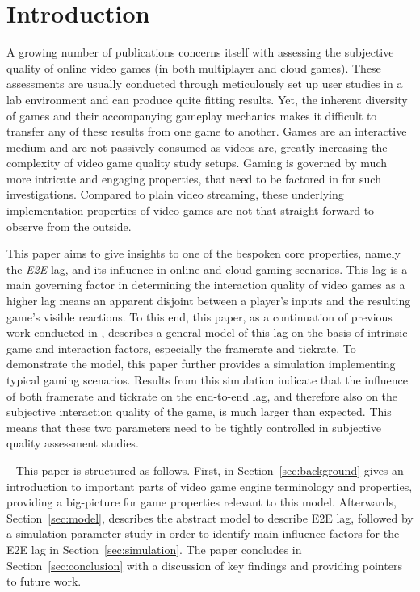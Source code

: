 \section{Introduction}
\label{sec:introduction}


A growing number of publications concerns itself with assessing the subjective quality of online video games (in both multiplayer and cloud games). These assessments are usually conducted through meticulously set up user studies in a lab environment and can produce quite fitting results. Yet, the inherent diversity of games and their accompanying gameplay mechanics makes it difficult to transfer any of these results from one game to another. Games are an interactive medium and are not passively consumed as videos are, greatly increasing the complexity of video game quality study setups. Gaming is governed by much more intricate and engaging properties, that need to be factored in for such investigations. Compared to plain video streaming, these underlying implementation properties of video games are not that straight-forward to observe from the outside.

This paper aims to give insights to one of the bespoken core properties, namely the \textit{\gls{E2E}} lag, and its influence in online and cloud gaming scenarios. This lag is a main governing factor in determining the interaction quality of video games as a higher lag means an apparent disjoint between a player's inputs and the resulting game's visible reactions. To this end, this paper, as a continuation of previous work conducted in \cite{metzger2016gamesframes}, describes a general model of this lag on the basis of intrinsic game and interaction factors, especially the framerate and tickrate. To demonstrate the model, this paper further provides a simulation implementing typical gaming scenarios. Results from this simulation indicate that the influence of both framerate and tickrate on the end-to-end lag, and therefore also on the subjective interaction quality of the game, is much larger than expected. This means that these two parameters need to be tightly controlled in subjective quality assessment studies.

~\newline
This paper is structured as follows. First, in Section~\ref{sec:background} gives an introduction to important parts of video game engine terminology and properties, providing a big-picture for game properties relevant to this model. Afterwards, Section~\ref{sec:model}, describes the abstract model to describe \gls{E2E} lag, followed by a simulation parameter study in order to identify main influence factors for the \gls{E2E} lag in Section~\ref{sec:simulation}. The paper concludes in Section~\ref{sec:conclusion} with a discussion of key findings and providing pointers to future work.


